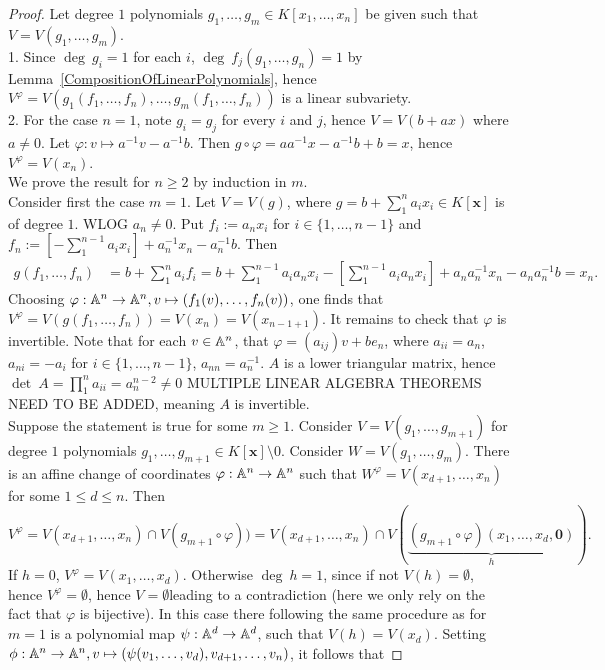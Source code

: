 \begin{proof}
    Let degree $1$ polynomials $g_1,\dots,g_m\in K[x_1,\dots,x_n]$ be given such that $V=V(g_1,\dots,g_m)$.\\   
    1. Since $\deg \ g_i = 1$ for each $i$, $\deg \ f_j(g_1,\dots,g_n) = 1$ by Lemma~\ref{CompositionOfLinearPolynomials}, hence $V^\varphi = V(g_1(f_1,\dots,f_n),\dots,g_m(f_1,\dots,f_n))$ is a linear subvariety.\\
    2. For the case $n=1$, note $g_i=g_j$ for every $i$ and $j$, hence $V=V(b+ax)$ where $a\neq 0$. Let $\varphi: v\mapsto a^{-1}v-a^{-1}b$. Then $g\circ \varphi = aa^{-1}x-a^{-1}b+b=x$, hence $V^\varphi = V(x_n)$.\\
    We prove the result for $n\geq 2$ by induction in $m$.\\
    Consider first the case $m=1$. Let $V=V(g)$, where $g = b+\sum_1^n a_ix_i\in K[\mathbf{x}]$ is of degree $1$. WLOG $a_n\neq 0$. Put $f_i := a_nx_i$ for $i\in\{1,\dots,n-1\}$ and $f_n := \left[-\sum_1^{n-1} a_ix_i \right]+a_n^{-1}x_n-a_n^{-1}b$. Then 
    \begin{align*}
        g(f_1,\dots,f_n)&=b+\sum_1^n a_if_i = b + \sum_1^{n-1} a_ia_nx_i -\left[\sum_1^{n-1}a_ia_nx_i\right]+a_na_n^{-1}x_n-a_na_n^{-1}b = x_n.
    \end{align*}
    Choosing $\varphi: \mathbb{A}^n\rightarrow \mathbb{A}^n, v\mapsto (f_1(v),\dots,f_n(v))$, one finds that $V^\varphi = V(g(f_1,\dots,f_n))=V(x_n)=V(x_{n-1+1})$. It remains to check that $\varphi$ is invertible. Note that for each $v\in\mathbb{A}^n$, that $\varphi = (a_{ij})v+be_n$, where $a_{ii}=a_n$, $a_{ni} = -a_i$ for $i\in\{1,\dots,n-1\}$, $a_{nn}=a_n^{-1}$. $A$ is a lower triangular matrix, hence $\det \ A = \prod_1^n a_{ii}= a_n^{n-2}\neq 0$ {\LARGE MULTIPLE LINEAR ALGEBRA THEOREMS NEED TO BE ADDED}, meaning $A$ is invertible.\\
    Suppose the statement is true for some $m\geq 1$. Consider $V=V(g_1,\dots,g_{m+1})$ for degree $1$ polynomials $g_1,\dots,g_{m+1}\in K[\mathbf{x}]\setminus 0$. Consider $W= V(g_1,\dots,g_m)$. There is an affine change of coordinates $\varphi: \mathbb{A}^n \rightarrow \mathbb{A}^n$ such that $W^\varphi = V(x_{d+1},\dots,x_n)$ for some $1\leq d\leq n$. Then 
    $$V^\varphi = V(x_{d+1},\dots,x_n)\cap V(g_{m+1}\circ \varphi)) = V(x_{d+1},\dots,x_n)\cap V(\underbrace{(g_{m+1}\circ \varphi)(x_1,\dots,x_d,\mathbf{0})}_{h}).$$
    If $h = 0$, $V^\varphi = V(x_1,\dots,x_d)$. Otherwise $\deg\ h = 1$, since if not $V(h)=\emptyset$, hence $V^\varphi =\emptyset$, hence $V=\emptyset$leading to a contradiction (here we only rely on the fact that $\varphi$ is bijective). In this case there following the same procedure as for $m=1$ is a polynomial map $\psi: \mathbb{A}^d \rightarrow \mathbb{A}^d$, such that $V(h) =V(x_d)$. Setting $\phi: \mathbb{A}^n\rightarrow \mathbb{A}^n, v\mapsto (\psi(v_1,\dots,v_d),v_{d+1},\dots,v_n)$, it follows that 

\end{proof}
